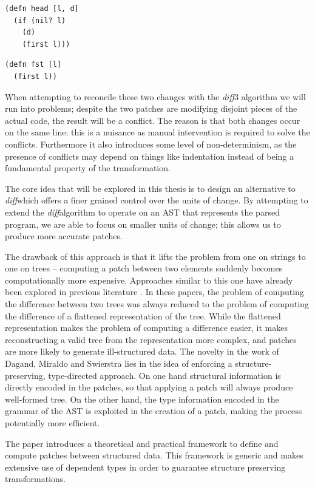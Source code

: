 \documentclass[11pt, titlepage]{article}
\newcommand{\diff}{\emph{diff}}
\begin{document}
\begin{verbatim}
(defn head [l, d]
  (if (nil? l)
    (d)
    (first l)))
\end{verbatim}

\begin{verbatim}
(defn fst [l]
  (first l))
\end{verbatim}

When attempting to reconcile these two changes with the \diff3 algorithm we will run into problems; despite the two patches are modifying disjoint pieces of the actual code, the result will be a conflict.
The reason is that both changes occur on the same line; this is a nuisance as manual intervention is required to solve the conflicts. Furthermore it also introduces some level of non-determinism, as the presence of conflicts may depend on things like indentation instead of being a fundamental property of the transformation. 

The core idea that will be explored in this thesis is to design an alternative to \diff which offers a finer grained control over the units of change. By attempting to extend the \diff algorithm to operate on an AST that represents the parsed program, we are able to focus on smaller units of change; this allows us to produce more accurate patches. 

The drawback of this approach is that it lifts the problem from one on strings to one on trees --
 computing a patch between two elements suddenly becomes computationally more expensive. 
Approaches similar to this one have already been explored in previous literature \cite{semantics-VC, structure-aware-VC, Vassena}. In these papers, the problem of computing the difference between two trees was always reduced to the problem of computing the difference of a flattened representation of the tree. 
While the flattened representation makes the problem of computing a difference easier, it makes reconstructing a valid tree from the representation more complex, and patches are more likely to generate ill-structured data.  
The novelty in the work of Dagand, Miraldo and Swierstra \cite{type-directed-diff} lies in the idea of enforcing a structure-preserving, type-directed approach. 
On one hand structural information is directly encoded in the patches, so that applying a patch will always produce well-formed tree. 
On the other hand, the type information encoded in the grammar of the AST is exploited in the creation of a patch, making the process potentially more efficient.

The paper introduces a theoretical and practical framework to define and compute patches between structured data. This framework is generic and makes extensive use of dependent types in order to guarantee structure preserving transformations. 
\end{document}
